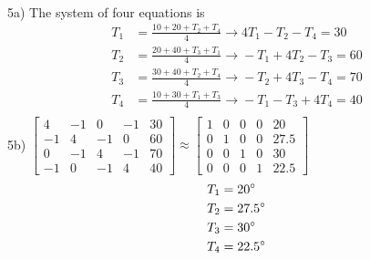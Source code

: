 \documentclass{article}
\begin{document}
\\
5a) The system of four equations is
\begin{align*}
    T_1 &= \frac{10 + 20 + T_2 + T_4}{4} \xrightarrow{} 4T_1 - T_2 - T_4 = 30\\
    T_2 &= \frac{20 + 40 + T_3 + T_1}{4} \xrightarrow{} -T_1 + 4T_2 - T_3 = 60\\
    T_3 &= \frac{30 + 40 + T_2 + T_4}{4} \xrightarrow{} -T_2 + 4T_3 - T_4 = 70\\
    T_4 &= \frac{10 + 30 + T_1 + T_3}{4} \xrightarrow{} -T_1 - T_3 + 4T_4  = 40\\
\end{align*}
5b)
$ \begin{bmatrix}
4 & -1 & 0 & -1 & 30 \\
-1 & 4 & -1 & 0 & 60 \\
0 & -1 & 4 & -1 & 70 \\
-1 & 0 & -1 & 4 & 40 
\end{bmatrix}  \approx
\begin{bmatrix}
1 & 0 & 0 & 0 & 20 \\
0 & 1 & 0 & 0 & 27.5 \\
0 & 0 & 1 & 0 & 30 \\
0 & 0 & 0 & 1 & 22.5 
\end{bmatrix}
$
\begin{align*}
    T_1 &= 20\degree \\
    T_2 &= 27.5\degree \\
    T_3 &= 30\degree \\
    T_4 &= 22.5\degree \\
\end{align*}
\end{document}
